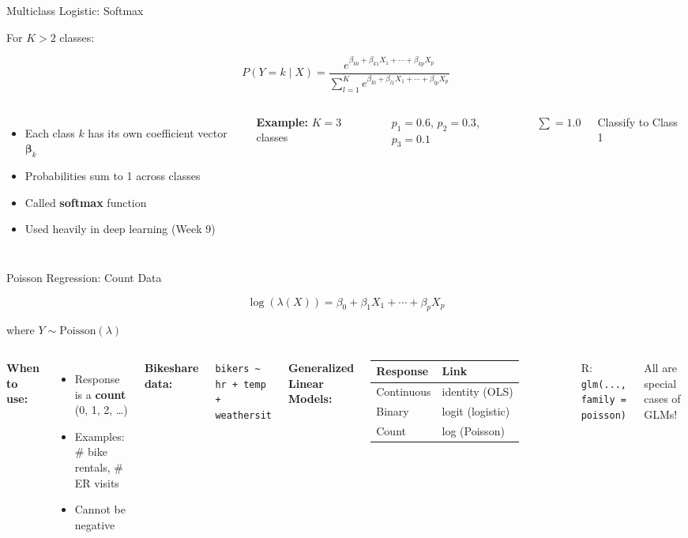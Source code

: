 \documentclass[aspectratio=169, 11pt]{beamer}
\begin{document}
\begin{frame}{Multiclass Logistic: Softmax}

For $K > 2$ classes:

$$P(Y = k \mid X) = \frac{e^{\beta_{k0} + \beta_{k1}X_1 + \cdots + \beta_{kp}X_p}}{\sum_{l=1}^{K} e^{\beta_{l0} + \beta_{l1}X_1 + \cdots + \beta_{lp}X_p}}$$

\begin{columns}
\begin{itemize}
  \item Each class $k$ has its own coefficient vector $\boldsymbol{\beta}_k$
  \item Probabilities sum to 1 across classes
  \item Called \textbf{softmax} function
  \item Used heavily in deep learning (Week 9)
\end{itemize}

\textbf{Example:} $K = 3$ classes

$p_1 = 0.6$, $p_2 = 0.3$, $p_3 = 0.1$

$\sum = 1.0$ \textcolor{softgreen}{\checkmark}

\vspace{0.3em}
Classify to Class 1
\end{columns}
\end{frame}


\begin{frame}{Poisson Regression: Count Data}

$$\log(\lambda(X)) = \beta_0 + \beta_1 X_1 + \cdots + \beta_p X_p$$

where $Y \sim \text{Poisson}(\lambda)$

\begin{columns}
\textbf{When to use:}
\begin{itemize}
  \item Response is a \textbf{count} (0, 1, 2, \ldots)
  \item Examples: \# bike rentals, \# ER visits
  \item Cannot be negative
\end{itemize}

\vspace{0.3em}
\textbf{Bikeshare data:}

\texttt{bikers \textasciitilde{} hr + temp + weathersit}

\textbf{Generalized Linear Models:}

\begin{tabular}{ll}
\toprule
Response & Link \\
\midrule
Continuous & identity (OLS) \\
Binary & logit (logistic) \\
Count & log (Poisson) \\
\bottomrule
\end{tabular}

\vspace{0.3em}
\footnotesize R: \texttt{glm(..., family = poisson)}

All are special cases of GLMs!
\end{columns}
\end{frame}
\end{document}
